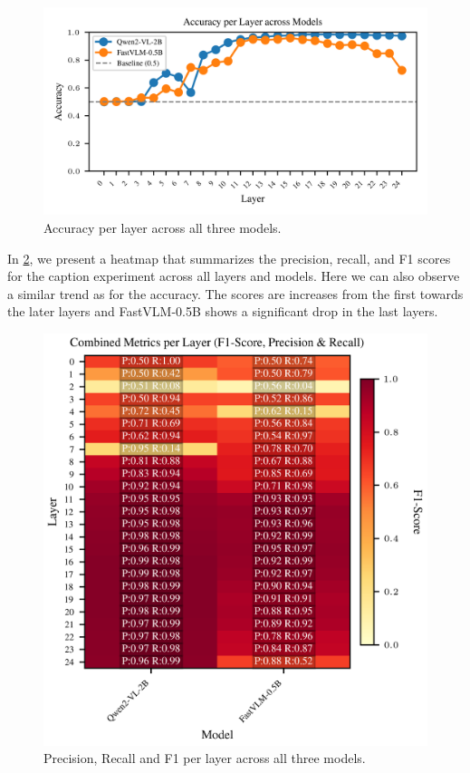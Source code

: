\documentclass[11pt]{article}
\begin{document}
\begin{figure}[H]
    \centering
    \includegraphics[width=1\linewidth]{figures/global/_combined_exp1/accuracy_lines_per_layer.png}
    \caption{Accuracy per layer across all three models.}
    \label{fig:accuracy_per_layer}
\end{figure}
In \ref{fig:combined_metrics_per_layer}, we present a heatmap that summarizes the precision, recall, and F1 scores for the caption experiment across all layers and models.
Here we can also observe a similar trend as for the accuracy. The scores are increases from the first towards the later layers and FastVLM-0.5B shows a significant drop in the last layers.
\begin{figure}[H]
    \centering
    \includegraphics[width=1\linewidth]{figures/global/_combined_exp1/combined_metrics_heatmap.png}
    \caption{Precision, Recall and F1 per layer across all three models.}
    \label{fig:combined_metrics_per_layer}
\end{figure}
\end{document}
